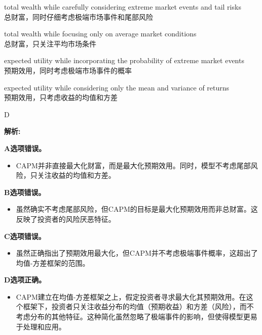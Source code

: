 \documentclass{article}
\newenvironment{explanation}
{\textbf{解析:}\par}
{\par}
\begin{document}
\begin{choices}
    \item total wealth while carefully considering extreme market events and tail risks
    \\
    总财富，同时仔细考虑极端市场事件和尾部风险
    \item total wealth while focusing only on average market conditions
    \\
    总财富，只关注平均市场条件
    \item expected utility while incorporating the probability of extreme market events
    \\
    预期效用，同时考虑极端市场事件的概率
    \item expected utility while considering only the mean and variance of returns
    \\
    预期效用，只考虑收益的均值和方差
\end{choices}

\begin{correctanswer}
    D
\end{correctanswer}

\begin{explanation}
    

    \textbf{A选项错误。}
    \begin{itemize}
        \item CAPM并非直接最大化财富，而是最大化预期效用。同时，模型不考虑尾部风险，只关注收益的均值和方差。
    \end{itemize}

    \textbf{B选项错误。}
    \begin{itemize}
        \item 虽然确实不考虑尾部风险，但CAPM的目标是最大化预期效用而非总财富。这反映了投资者的风险厌恶特征。
    \end{itemize}

    \textbf{C选项错误。}
    \begin{itemize}
        \item 虽然正确指出了预期效用最大化，但CAPM并不考虑极端事件概率，这超出了均值-方差框架的范围。
    \end{itemize}

    \textbf{D选项正确。}
    \begin{itemize}
        \item CAPM建立在均值-方差框架之上，假定投资者寻求最大化其预期效用。在这个框架下，投资者只关注收益分布的均值（预期收益）和方差（风险），而不考虑分布的其他特征。这种简化虽然忽略了极端事件的影响，但使得模型更易于处理和应用。
    \end{itemize}

\end{explanation}
\end{document}
